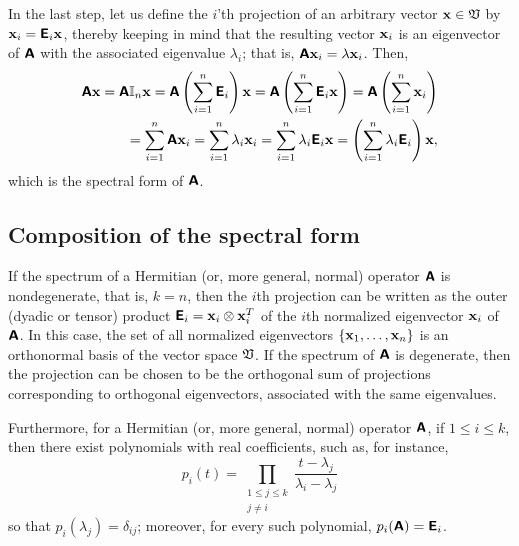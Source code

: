 {In the last step, let us define the $i$'th projection of an arbitrary vector ${\bf x}\in \frak V$
by ${\bf x}_i =  \textsf{\textbf{E}}_i  {\bf x}$, thereby keeping in mind that the resulting vector ${\bf x}_i$
is an eigenvector of $\textsf{\textbf{A}}$  with the associated eigenvalue $\lambda_i$; that is, $\textsf{\textbf{A}}{\bf x}_i = \lambda {\bf x}_i$.
Then,
\begin{equation}
\begin{split}
\textsf{\textbf{A}} {\bf x} =
\textsf{\textbf{A}} {\Bbb I}_n {\bf x} =
\textsf{\textbf{A}} \left(\sum_{i=1}^n \textsf{\textbf{E}}_i\right) {\bf x} =
\textsf{\textbf{A}} \left(\sum_{i=1}^n \textsf{\textbf{E}}_i {\bf x}\right) =
\textsf{\textbf{A}} \left(\sum_{i=1}^n {\bf x}_i\right)  \\
=
 \sum_{i=1}^n \textsf{\textbf{A}} {\bf x}_i  =
 \sum_{i=1}^n \lambda_i {\bf x}_i   =
 \sum_{i=1}^n \lambda_i \textsf{\textbf{E}}_i   {\bf x}=
\left( \sum_{i=1}^n \lambda_i \textsf{\textbf{E}}_i \right) {\bf x},
\end{split}
\end{equation}
which is the spectral form of $\textsf{\textbf{A}}$.
\eproof
}

\subsection{Composition of the spectral form}

If the spectrum of a  Hermitian (or, more general, normal) operator $\textsf{\textbf{A}}$ is nondegenerate, that is, $k=n$, then the
$i$th projection
can be written as the outer (dyadic or tensor) product
$
\textsf{\textbf{E}}_i={\bf x}_i \otimes {\bf x}_i^T$
of the $i$th normalized eigenvector ${\bf x}_i $ of $\textsf{\textbf{A}}$.
In this case, the set of all normalized eigenvectors $\{{\bf x}_1, \ldots ,{\bf x}_n\}$ is an orthonormal basis of the vector space $\frak V$.
If the spectrum of $\textsf{\textbf{A}}$ is degenerate, then the projection can be chosen to be the orthogonal sum of projections
corresponding to orthogonal eigenvectors, associated with the same  eigenvalues.

Furthermore, for a  Hermitian (or, more general, normal) operator $\textsf{\textbf{A}}$,
if $1\le i \le k$,
then there exist polynomials with real coefficients, such as,  for instance,
\begin{equation}
p_i  (t)
=
\prod_{
\begin{array}{c}
1\le j\le k\\
j\neq i
\end{array}
}
\frac{t-\lambda_j}{\lambda_i -\lambda_j}
\label{2011-m-epsf}
\end{equation}
so that
$p_i(\lambda_j) =\delta_{ij}$;
moreover, for every such polynomial,
$p_i(\textsf{\textbf{A}})=\textsf{\textbf{E}}_i$.

